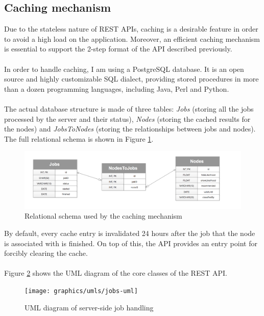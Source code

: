  
	\subsection{Caching mechanism} \label{Section: impl/REST/caching}
	Due to the stateless nature of REST APIs, caching is a desirable feature in order to avoid a high load on the application. Moreover, an efficient caching mechanism is essential to support the 2-step format of the API described previously. 
	\\ \\
	In order to handle caching, I am using a PostgreSQL database. It is an open source and highly customizable SQL dialect, providing stored procedures in more than a dozen programming languages, including Java, Perl and Python. 
	\\ \\
	The actual database structure is made of three tables: \textit{Jobs} (storing all the jobs processed by the server and their status), \textit{Nodes} (storing the cached results for the nodes) and \textit{JobsToNodes} (storing the relationships between jobs and nodes). The full relational schema is shown in Figure \ref{Fig: impl/REST/cache/relational}.
	\begin{figure}[H]
		\centering
		\includegraphics[width=\textwidth]{graphics/cache-schema}
		\caption[Cache schema]{Relational schema used by the caching mechanism}
		\label{Fig: impl/REST/cache/relational}
	\end{figure}
	By default, every cache entry is invalidated 24 hours after the job that the node is associated with is finished. On top of this, the API provides an entry point for forcibly clearing the cache. 
	\\ \\
	Figure \ref{Fig: impl/REST/cache/jobs} shows the UML diagram of the core classes of the REST API.
	\begin{figure}[H]
		\centering
		\texttt{[image: graphics/umls/jobs-uml]}
		\caption{UML diagram of server-side job handling}
		\label{Fig: impl/REST/cache/jobs}
	\end{figure}
	
